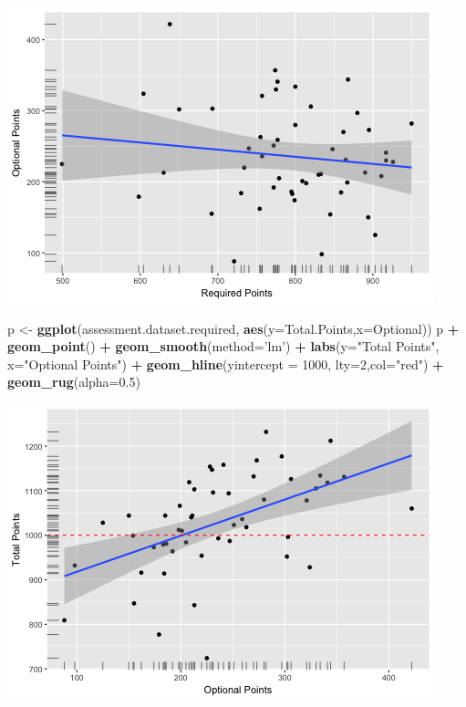 \documentclass[]{article}
\newenvironment{Shaded}{\begin{snugshade}}{\end{snugshade}}
\newcommand{\KeywordTok}[1]{\textcolor[rgb]{0.13,0.29,0.53}{\textbf{#1}}}
\newcommand{\DataTypeTok}[1]{\textcolor[rgb]{0.13,0.29,0.53}{#1}}
\newcommand{\DecValTok}[1]{\textcolor[rgb]{0.00,0.00,0.81}{#1}}
\newcommand{\FloatTok}[1]{\textcolor[rgb]{0.00,0.00,0.81}{#1}}
\newcommand{\StringTok}[1]{\textcolor[rgb]{0.31,0.60,0.02}{#1}}
\newcommand{\OperatorTok}[1]{\textcolor[rgb]{0.81,0.36,0.00}{\textbf{#1}}}
\newcommand{\NormalTok}[1]{#1}
\begin{document}
\includegraphics{figures/required-optional-correlations-2.png}

\begin{Shaded}
\begin{Highlighting}[]
\NormalTok{p <-}\StringTok{ }\KeywordTok{ggplot}\NormalTok{(assessment.dataset.required, }\KeywordTok{aes}\NormalTok{(}\DataTypeTok{y=}\NormalTok{Total.Points,}\DataTypeTok{x=}\NormalTok{Optional))}
\NormalTok{p }\OperatorTok{+}\StringTok{ }\KeywordTok{geom_point}\NormalTok{() }\OperatorTok{+}
\StringTok{  }\KeywordTok{geom_smooth}\NormalTok{(}\DataTypeTok{method=}\StringTok{'lm'}\NormalTok{) }\OperatorTok{+}
\StringTok{  }\KeywordTok{labs}\NormalTok{(}\DataTypeTok{y=}\StringTok{"Total Points"}\NormalTok{, }\DataTypeTok{x=}\StringTok{"Optional Points"}\NormalTok{) }\OperatorTok{+}
\StringTok{  }\KeywordTok{geom_hline}\NormalTok{(}\DataTypeTok{yintercept =} \DecValTok{1000}\NormalTok{, }\DataTypeTok{lty=}\DecValTok{2}\NormalTok{,}\DataTypeTok{col=}\StringTok{"red"}\NormalTok{) }\OperatorTok{+}
\StringTok{  }\KeywordTok{geom_rug}\NormalTok{(}\DataTypeTok{alpha=}\FloatTok{0.5}\NormalTok{)}
\end{Highlighting}
\end{Shaded}

\includegraphics{figures/required-optional-correlations-3.png}
\end{document}
